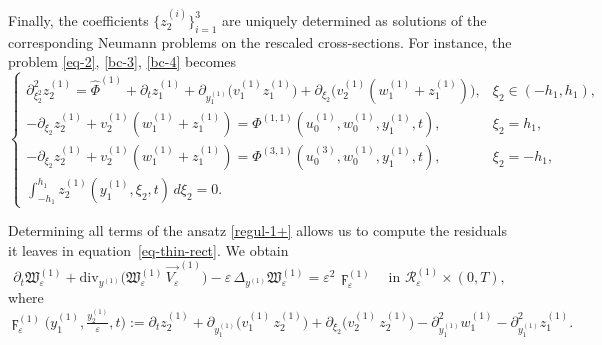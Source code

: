 \documentclass[reqno]{amsart}            %
\numberwithin{equation}{section}
\begin{document}
	
	Finally, the coefficients $\{z_2^{(i)}\}_{i=1}^3$ are uniquely determined as
	solutions of the corresponding Neumann problems on the rescaled
	cross-sections.  
	For instance, the problem \eqref{eq-2}, \eqref{bc-3}, \eqref{bc-4} becomes
	\begin{equation}\label{prob-z-2}
		\left\{
		\begin{array}{ll}
			\partial_{\xi_2^2}^2 z^{(1)}_2
			=
			\widehat{\Phi}^{(1)}
			+ \partial_t z^{(1)}_1
			+ \partial_{y^{(1)}_1}\!\big(v_1^{(1)} z^{(1)}_1\big)
			+ \partial_{\xi_2}\!\big(v_2^{(1)}(w^{(1)}_1 + z^{(1)}_1)\big),
			& \xi_2\in(-h_1,h_1),
			\\[2mm]
			-\partial_{\xi_2} z^{(1)}_2
			+ v_2^{(1)}(w^{(1)}_1 + z^{(1)}_1)
			= \Phi^{(1,1)}(u^{(1)}_0,w^{(1)}_0,y^{(1)}_1,t),
			& \xi_2=h_1,
			\\[2mm]
			-\partial_{\xi_2} z^{(1)}_2
			+ v_2^{(1)}(w^{(1)}_1 + z^{(1)}_1)
			= \Phi^{(3,1)}(u^{(3)}_0,w^{(1)}_0,y^{(1)}_1,t),
			& \xi_2=-h_1,
			\\[2mm]
			\displaystyle \int_{-h_1}^{h_1} z_2^{(1)}(y^{(1)}_1,\xi_2,t)\,d\xi_2 = 0.
			&
		\end{array}
		\right.
	\end{equation}
	
	Determining all terms of the ansatz \eqref{regul-1+} allows us to compute the
	residuals it leaves in equation~\eqref{eq-thin-rect}. We obtain
	\begin{equation}\label{eq-thin-rect+}
		\partial_t \mathfrak{W}^{(1)}_\varepsilon
		+ \mathrm{div}_{y^{(1)}}\!\big(\mathfrak{W}^{(1)}_\varepsilon\,\overrightarrow{V_\varepsilon}^{(1)}\big)
		- \varepsilon\,\Delta_{y^{(1)}}\mathfrak{W}^{(1)}_\varepsilon
		= \varepsilon^2\,\digamma^{(1)}_\varepsilon
		\quad\text{in }\mathcal{R}_\varepsilon^{(1)}\times(0,T),
	\end{equation}
	where
	\begin{equation}\label{digamma}
		\digamma^{(1)}_\varepsilon\big(y^{(1)}_1, \tfrac{{y}^{(1)}_2}{\varepsilon}, t\big)
		:= \partial_t z_2^{(1)} + \partial_{y^{(1)}_1}\big(v_1^{(1)} \, z^{(1)}_2\big) + 
		\partial_{\xi_2}\big(v_2^{(1)} \,z^{(1)}_2\big) - \partial^2_{y^{(1)}_1}w^{(1)}_1
		- \partial^2_{y^{(1)}_1}z^{(1)}_1 .
	\end{equation}
	
\end{document}

